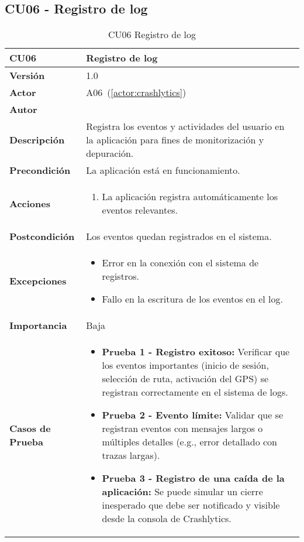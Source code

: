 \subsection{CU06 - Registro de log}
\begin{table}[H]
	\centering
	\begin{tabularx}{\linewidth}{ p{} p{} }
		\toprule
		\textbf{CU06}    & \textbf{Registro de log} \\
		\toprule
		\textbf{Versión}              & 1.0    \\
		\textbf{Actor}                & A06~(\ref{actor:crashlytics}) \\
		\textbf{Autor}                & \autor \\
		\textbf{Descripción}          & Registra los eventos y actividades del usuario en la aplicación para fines de monitorización y depuración. \\
		\textbf{Precondición}         & La aplicación está en funcionamiento. \\
		\textbf{Acciones}             &
		\begin{enumerate}
			\def\labelenumi{\arabic{enumi}.}
			\tightlist
			\item La aplicación registra automáticamente los eventos relevantes.
		\end{enumerate}\\
		\textbf{Postcondición}        & Los eventos quedan registrados en el sistema. \\
		\textbf{Excepciones}          & 
		\begin{itemize}
			\tightlist
			\item Error en la conexión con el sistema de registros.
			\item Fallo en la escritura de los eventos en el log.
		\end{itemize}\\
		\textbf{Importancia}          & Baja \\
		\textbf{Casos de Prueba}      &
		\begin{itemize}
			\item \textbf{Prueba 1 - Registro exitoso:} Verificar que los eventos importantes (inicio de sesión, selección de ruta, activación del GPS) se registran correctamente en el sistema de logs.
			\vspace{2pt}
			\item \textbf{Prueba 2 - Evento límite:} Validar que se registran eventos con mensajes largos o múltiples detalles (e.g., error detallado con trazas largas).
			\vspace{2pt}
			\item \textbf{Prueba 3 - Registro de una caída de la aplicación:} Se puede simular un cierre inesperado que debe ser notificado y visible desde la consola de Crashlytics.
		\end{itemize} \\
		\bottomrule
	\end{tabularx}
	\caption{CU06 Registro de log}
	\label{cu:registro-log}
\end{table}




